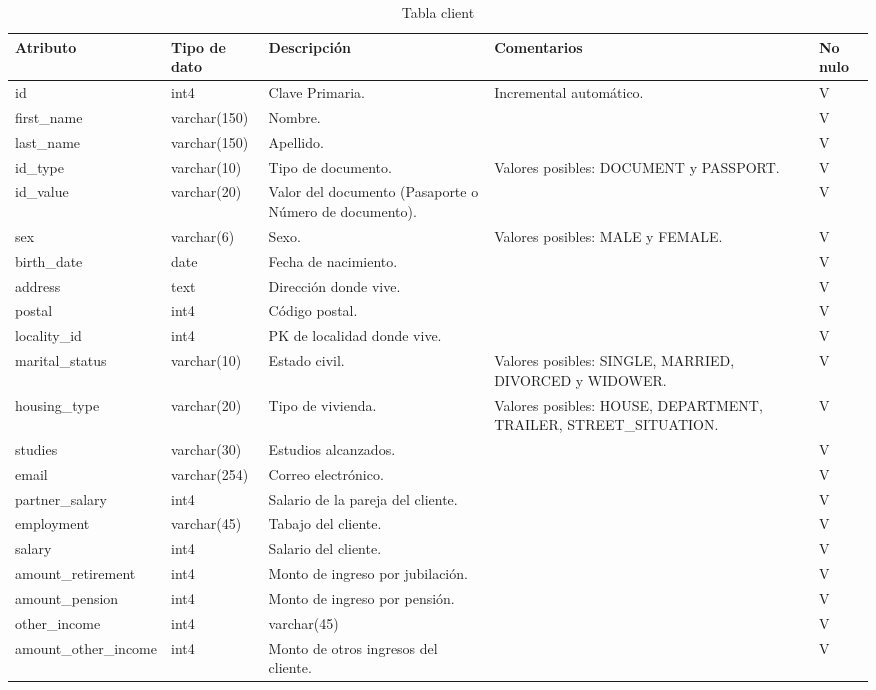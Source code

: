 \begin{table}[H]
\centering
\label{tab:client}
\begin{tabular}{|p{3cm}|p{2.5cm}|p{4.5cm}|p{4cm}|p{1cm}|}
\hline
\textbf{Atributo} & \textbf{Tipo de dato}  & \textbf{Descripción} & \textbf{Comentarios} & \textbf{No nulo} \\ \hline
id & int4 & Clave Primaria. & Incremental automático. & V \\ \hline
first\_name & varchar(150) & Nombre. &  & V \\ \hline
last\_name & varchar(150) & Apellido. &  & V \\ \hline
id\_type & varchar(10) & Tipo de documento. & Valores posibles: DOCUMENT y PASSPORT. & V \\ \hline
id\_value & varchar(20) & Valor del documento (Pasaporte o Número de documento). & & V \\ \hline
sex & varchar(6) & Sexo. & Valores posibles: MALE y FEMALE. & V \\ \hline
birth\_date & date & Fecha de nacimiento. & & V \\ \hline
address & text & Dirección donde vive. & & V \\ \hline
postal & int4 & Código postal. & & V \\ \hline
locality\_id & int4 & PK de localidad donde vive. & & V \\ \hline
marital\_status & varchar(10) & Estado civil. & Valores posibles: SINGLE, MARRIED, DIVORCED y WIDOWER. & V \\ \hline
housing\_type & varchar(20) & Tipo de vivienda. & Valores posibles: HOUSE, DEPARTMENT, TRAILER, STREET\_SITUATION. & V \\ \hline
studies & varchar(30) & Estudios alcanzados. & & V \\ \hline
email & varchar(254) & Correo electrónico. & & V \\ \hline
partner\_salary & int4 & Salario de la pareja del cliente. &  & V \\ \hline
employment & varchar(45) & Tabajo del cliente. &  & V \\ \hline
salary & int4 & Salario del cliente. &  & V \\ \hline
amount\_retirement & int4 & Monto de ingreso por jubilación. &  & V \\ \hline
amount\_pension & int4 & Monto de ingreso por pensión. &  & V \\ \hline
other\_income & int4 & varchar(45) &  & V \\ \hline
amount\_other\_income & int4 & Monto de otros ingresos del cliente. &  & V \\ 
\end{tabular}
\caption{Tabla client}
\end{table}


